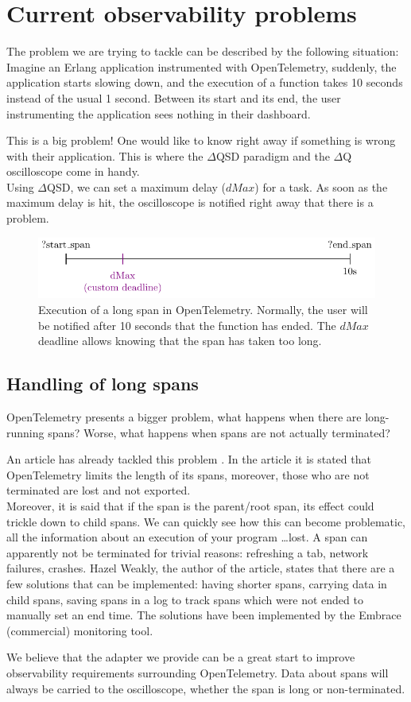 \section{Current observability problems}
    The problem we are trying to tackle can be described by the following situation: 
    Imagine an Erlang application instrumented with OpenTelemetry, suddenly, the application starts slowing down, and the execution of a function takes 10 seconds instead of the usual 1 second. Between its start and its end, the user instrumenting the application sees nothing in their dashboard.
    
    This is a big problem! One would like to know right away if something is wrong with their application. This is where the $\Delta$QSD paradigm and the $\Delta$Q oscilloscope come in handy. \\ 
   Using $\Delta$QSD, we can set a maximum delay ($dMax$) for a task. As soon as the maximum delay is hit, the oscilloscope is notified right away that there is a problem.
   
   \begin{figure}[H]
        \begin{center}
            \includegraphics{tikz/start_end_dmax.pdf}
        \end{center}
        \caption{Execution of a long span in OpenTelemetry. Normally, the user will be notified after 10 seconds that the function has ended. The $dMax$ deadline allows knowing that the span has taken too long.}
        \label{fig:otel_dmax}
    \end{figure} 


    \subsection{Handling of long spans}
        OpenTelemetry presents a bigger problem, what happens when there are long-running spans? Worse, what happens when spans are not actually terminated?
        
        An article has already tackled this problem \cite{otel-l}. In the article it is stated that OpenTelemetry limits the length of its spans, moreover, those who are not terminated are lost and not exported. \\ 
        Moreover, it is said that if the span is the parent/root span, its effect could trickle down to child spans. We can quickly see how this can become problematic, all the information about an execution of your program \dots lost. A span can apparently not be terminated for trivial reasons: refreshing a tab, network failures, crashes. Hazel Weakly, the author of the article, states that there are a few solutions that can be implemented: having shorter spans, carrying data in child spans, saving spans in a log to track spans which were not ended to manually set an end time. The solutions have been implemented by the Embrace (commercial) monitoring tool. \cite{embr}

     We believe that the adapter we provide can be a great start to improve observability requirements surrounding OpenTelemetry. Data about spans will always be carried to the oscilloscope, whether the span is long or non-terminated.

